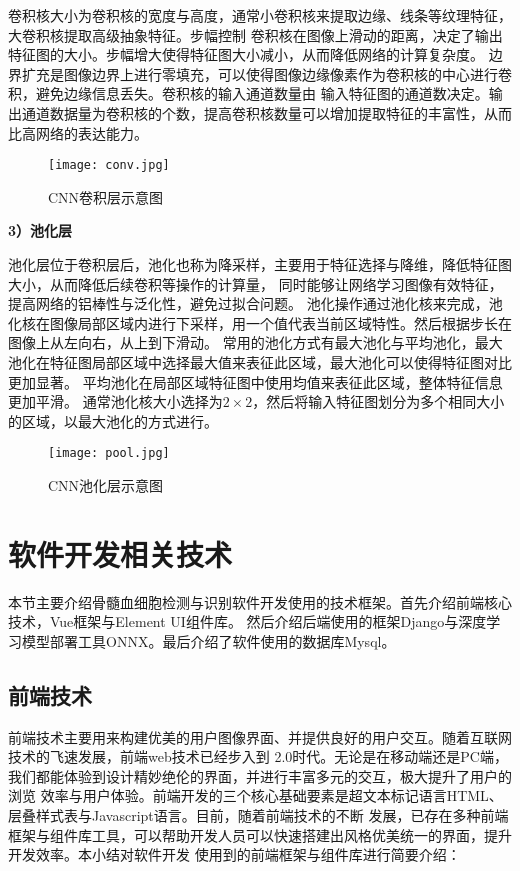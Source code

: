 卷积核大小为卷积核的宽度与高度，通常小卷积核来提取边缘、线条等纹理特征，大卷积核提取高级抽象特征。步幅控制
卷积核在图像上滑动的距离，决定了输出特征图的大小。步幅增大使得特征图大小减小，从而降低网络的计算复杂度。
边界扩充是图像边界上进行零填充，可以使得图像边缘像素作为卷积核的中心进行卷积，避免边缘信息丢失。卷积核的输入通道数量由
输入特征图的通道数决定。输出通道数据量为卷积核的个数，提高卷积核数量可以增加提取特征的丰富性，从而比高网络的表达能力。

\begin{figure}
  \centering
  \texttt{[image: conv.jpg]}
  \caption{CNN卷积层示意图}
  \label{fig:conv}
\end{figure}

\textbf{3）池化层}

池化层位于卷积层后，池化也称为降采样，主要用于特征选择与降维，降低特征图大小，从而降低后续卷积等操作的计算量，
同时能够让网络学习图像有效特征，提高网络的铝棒性与泛化性，避免过拟合问题。
池化操作通过池化核来完成，池化核在图像局部区域内进行下采样，用一个值代表当前区域特性。然后根据步长在图像上从左向右，从上到下滑动。
常用的池化方式有最大池化与平均池化，最大池化在特征图局部区域中选择最大值来表征此区域，最大池化可以使得特征图对比更加显著。
平均池化在局部区域特征图中使用均值来表征此区域，整体特征信息更加平滑。
通常池化核大小选择为$2 \times 2$，然后将输入特征图划分为多个相同大小的区域，以最大池化的方式进行。

\begin{figure}
  \centering
  \texttt{[image: pool.jpg]}
  \caption{CNN池化层示意图}
  \label{fig:pool}
\end{figure}


\section{软件开发相关技术}
本节主要介绍骨髓血细胞检测与识别软件开发使用的技术框架。首先介绍前端核心技术，Vue框架与Element UI组件库。
然后介绍后端使用的框架Django与深度学习模型部署工具ONNX。最后介绍了软件使用的数据库Mysql。

\subsection{前端技术}

前端技术主要用来构建优美的用户图像界面、并提供良好的用户交互。随着互联网技术的飞速发展，前端web技术已经步入到
2.0时代。无论是在移动端还是PC端，我们都能体验到设计精妙绝伦的界面，并进行丰富多元的交互，极大提升了用户的浏览
效率与用户体验。前端开发的三个核心基础要素是超文本标记语言HTML、层叠样式表与Javascript语言。目前，随着前端技术的不断
发展，已存在多种前端框架与组件库工具，可以帮助开发人员可以快速搭建出风格优美统一的界面，提升开发效率。本小结对软件开发
使用到的前端框架与组件库进行简要介绍：

